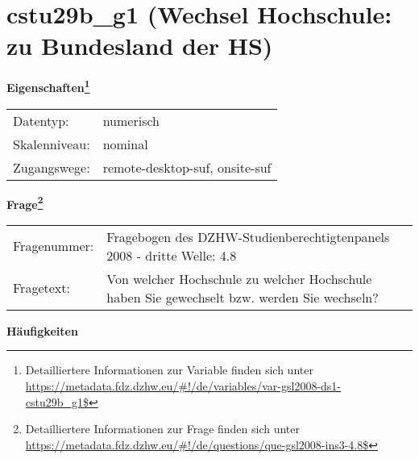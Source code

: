 
    \setcounter{footnote}{0}

    \vspace*{-1.8cm}
	\section{cstu29b\_g1 (Wechsel Hochschule: zu Bundesland der HS)}
	\label{section:cstu29b_g1}



    \vspace*{0.5cm}
    \noindent\textbf{Eigenschaften\footnote{Detailliertere Informationen zur Variable finden sich unter
		\url{https://metadata.fdz.dzhw.eu/\#!/de/variables/var-gsl2008-ds1-cstu29b_g1$}}}\\
	\begin{tabularx}{\hsize}{@{}lX}
	Datentyp: & numerisch \\
	Skalenniveau: & nominal \\
	Zugangswege: &
	  remote-desktop-suf, 
	  onsite-suf
 \\
    \end{tabularx}



				\vspace*{0.5cm}
                \noindent\textbf{Frage\footnote{Detailliertere Informationen zur Frage finden sich unter
		              \url{https://metadata.fdz.dzhw.eu/\#!/de/questions/que-gsl2008-ins3-4.8$}}}\\
				\begin{tabularx}{\hsize}{@{}lX}
					Fragenummer: &
					  Fragebogen des DZHW-Studienberechtigtenpanels 2008 - dritte Welle:
					  4.8
 \\
					Fragetext: & Von welcher Hochschule zu welcher Hochschule haben Sie gewechselt bzw. werden Sie wechseln? \\
				\end{tabularx}





        		\vspace*{0.5cm}
                \noindent\textbf{Häufigkeiten}

